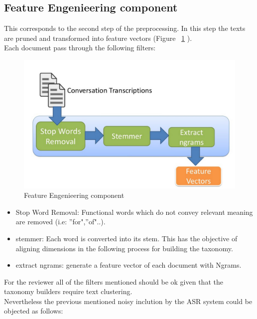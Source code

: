 \documentclass[4pt,a4paper,twocolumn]{article}
\begin{document}
\subsection{Feature Engenieering component}

This corresponds to the second step of the preprocessing. In this step the texts are pruned and transformed into feature vectors (Figure ~\ref{fig:eng_component} ).\\
Each document pass through the following filters:

\begin{figure}[]
  \centering
    \includegraphics[scale=0.2]{pics/eng_component.jpg}
    \caption{Feature Engenieering component}
   \label{fig:eng_component}  
\end{figure}

\begin{itemize}
	\item Stop Word Removal: Functional words which do not convey relevant meaning are removed (i.e: ''for",''of"..).
	
	\item stemmer: Each word is converted into its stem. This has the objective of aligning dimensions in the following process for building the taxonomy.
	
	\item extract ngrams:  generate a feature vector of each document with Ngrams.
\end{itemize}

For the reviewer all of the filters mentioned should be ok given that the taxonomy builders require text clustering.\\
Nevertheless the previous mentioned noisy inclution by the ASR system could be objected as follows:
\end{document}
